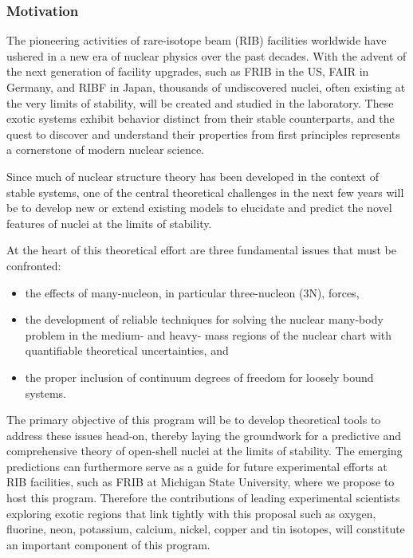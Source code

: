 \documentclass{beamer}
\begin{document}
\begin{frame}
\frametitle{Motivation}

\begin{block}{}


The pioneering activities of rare-isotope beam (RIB) facilities worldwide have 
ushered in a new era of nuclear physics over the past decades. With the advent of 
the next generation of facility upgrades, such as FRIB in the US, FAIR in Germany, 
and RIBF in Japan, thousands of undiscovered nuclei, often existing at the very 
limits of stability, will be created and studied in the laboratory. These exotic 
systems exhibit behavior distinct from their stable counterparts, and the quest to 
discover and understand their properties from first principles represents a 
cornerstone of modern nuclear science.

Since much of nuclear structure theory has been developed in the
context of stable systems, one of the central theoretical challenges
in the next few years will be to develop new or extend existing models
to elucidate and predict the novel features of nuclei at the limits of
stability.  

At the heart of this theoretical effort are three fundamental issues that must be confronted:
\begin{itemize}
\item the effects of many-nucleon, in particular three-nucleon (3N), forces, 

\item the development of reliable techniques for solving the nuclear many-body problem in the medium- and heavy- mass regions of the nuclear chart with quantifiable theoretical uncertainties, and 

\item the proper inclusion of continuum degrees of freedom for loosely bound systems. 
\end{itemize}

\noindent
The primary objective of this program will be to develop theoretical tools to  address these issues head-on, thereby laying the groundwork for a predictive and comprehensive theory of open-shell nuclei at the limits of stability.  The emerging predictions can furthermore serve as a guide for future experimental efforts at RIB facilities, such as FRIB at Michigan State University, where we propose to host this program.  Therefore the contributions of leading experimental scientists exploring exotic regions that link tightly with this proposal such as oxygen, fluorine, neon, potassium, calcium, nickel, copper and tin isotopes, will constitute an important component of this program.
\end{block}
\end{frame}
\end{document}
